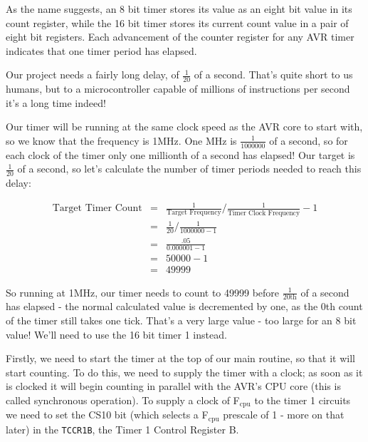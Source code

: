 \documentclass[a4paper,oneside]{book}
\newcommand{\subscript}[1]{\ensuremath{_{\textrm{#1}}}}
\begin{document}
As the name suggests, an 8 bit timer stores its value as an eight bit value in its count register, while the 16 bit timer stores its current count value in a pair of eight bit registers. Each advancement of the counter register for any AVR timer indicates that one timer period has elapsed.

Our project needs a fairly long delay, of \(\frac{1}{20}\) of a second. That's quite short to us humans, but to a microcontroller capable of millions of instructions per second it's a long time indeed!

Our timer will be running at the same clock speed as the AVR core to start with, so we know that the frequency is 1MHz. One MHz is \(\frac{1}{1000000}\) of a second, so for each clock of the timer only one millionth of a second has elapsed! Our target is \(\frac{1}{20}\) of a second, so let's calculate the number of timer periods needed to reach this delay:

\begin{displaymath}
\begin{array}{rcl}
\text{Target Timer Count} & = & \frac{1}{\text{Target Frequency}} / \frac{1}{\text{Timer Clock Frequency}} - 1 \\
                          & = & \frac{1}{20} / \frac{1}{1000000 - 1} \\
                          & = & \frac{.05}{0.000001 - 1} \\
                          & = & 50000 - 1 \\
                          & = & 49999
\end{array}
\end{displaymath}

So running at 1MHz, our timer needs to count to 49999 before \(\frac{1}{20\text{th}}\) of a second has elapsed - the normal calculated value is decremented by one, as the 0th count of the timer still takes one tick. That's a very large value - too large for an 8 bit value! We'll need to use the 16 bit timer 1 instead.

Firstly, we need to start the timer at the top of our main routine, so that it will start counting. To do this, we need to supply the timer with a clock; as soon as it is clocked it will begin counting in parallel with the AVR's CPU core (this is called synchronous operation). To supply a clock of F\subscript{cpu} to the timer 1 circuits we need to set the CS10 bit (which selects a F\subscript{cpu} prescale of 1 - more on that later) in the \texttt{TCCR1B}, the Timer 1 Control Register B. 
\end{document}
